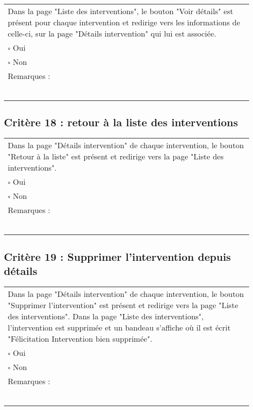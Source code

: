 	\begin{center}
    	 		\begin{tabular}[h]{|p{}|}
			\hline
				Dans la page "Liste des interventions", le bouton "Voir détails" est présent pour chaque intervention et redirige vers les informations de celle-ci, sur la page "Détails intervention" qui lui est associée.\\
				$\square$ Oui  \\ $\square$ Non \\\hline Remarques : \\ ~\\
			 \\\hline
     		\end{tabular}
  		\end{center}	
  		
  		
  		\subsection*{Critère 18 : retour à la liste des interventions}
	
	\begin{center}
    	 		\begin{tabular}[h]{|p{}|}
			\hline
				Dans la page "Détails intervention" de chaque intervention, le bouton "Retour à la liste" est présent et redirige vers la page "Liste des interventions".\\
				$\square$ Oui  \\ $\square$ Non \\\hline Remarques : \\ ~\\
			 \\\hline
     		\end{tabular}
  		\end{center}	
  		
  		
  		\subsection*{Critère 19 : Supprimer l'intervention depuis détails}
	
	\begin{center}
    	 		\begin{tabular}[h]{|p{}|}
			\hline
				Dans la page "Détails intervention" de chaque intervention, le bouton "Supprimer l'intervention" est présent et redirige vers la page "Liste des interventions". Dans la page "Liste des interventions", l'intervention est supprimée et un bandeau s'affiche où il est écrit "Félicitation Intervention bien supprimée".\\
				$\square$ Oui  \\ $\square$ Non \\\hline Remarques : \\ ~\\
			 \\\hline
     		\end{tabular}
  		\end{center}
  		
